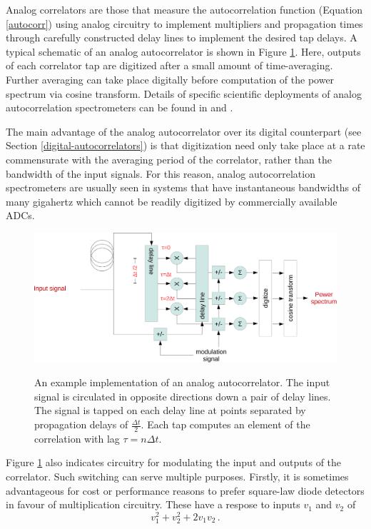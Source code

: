 \documentclass{ws-rv961x669}
\begin{document}
Analog correlators are those that measure the autocorrelation function (Equation \ref{autocorr}) using analog circuitry to implement multipliers and propagation times through carefully constructed delay lines to implement the desired tap delays.
A typical schematic of an analog autocorrelator is shown in Figure \ref{fig:analog-autocorr}. Here, outputs of each correlator tap are digitized after a small amount of time-averaging. Further averaging can take place digitally before computation of the power spectrum via cosine transform. Details of specific scientific deployments of analog autocorrelation spectrometers can be found in \cite{Erickson2007} and \cite{Harris1998}.

The main advantage of the analog autocorrelator over its digital counterpart (see Section \ref{digital-autocorrelators}) is that digitization need only take place at a rate commensurate with the averaging period of the correlator, rather than the bandwidth of the input signals. For this reason, analog autocorrelation spectrometers are usually seen in systems that have instantaneous bandwidths of many gigahertz which cannot be readily digitized by commercially available ADCs.


\begin{figure}
 \centering
 \includegraphics[width=\textwidth]{./figures/analog-autocorr-crop.pdf}
 \label{fig:analog-autocorr}
 \caption{An example implementation of an analog autocorrelator. The input signal is circulated in opposite directions down a pair of delay lines. The signal is tapped on each delay line at points separated by propagation delays of $\frac{\Delta t}{2}$. Each tap computes an element of the correlation with lag $\tau=n\Delta t$.}
\end{figure}

Figure \ref{fig:analog-autocorr} also indicates circuitry for modulating the input and outputs of the correlator. Such switching can serve multiple purposes. Firstly, it is sometimes advantageous for cost or performance reasons to prefer square-law diode detectors in favour of multiplication circuitry. These have a respose to inputs $v_1$ and $v_2$ of
\begin{equation}
 v_1^2 + v_2^2 + 2v_1v_2 \, .
\end{equation}
\end{document}
